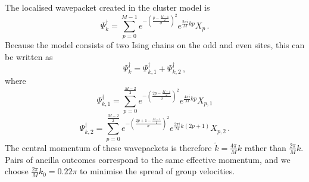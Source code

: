 \documentclass[aps,floatfix,10pt,amssymb,amsfont,amsmath,superscriptaddress,float,nofootinbib,longbibliography,nobalancelastpage,twocolumn]{revtex4-2}
\begin{document}
The localised wavepacket created in the cluster model is
\begin{equation}
    \Psi_k^{\dagger} = \sum_{p=0}^{M-1} e^{-\left(\frac{p-\frac{M-1}{2}}{\sigma}\right)^2}e^{\frac{2\pi i}{M}k p} X_p \,.
\end{equation}
Because the model consists of two Ising chains on the odd and even sites, this can be written as
\begin{equation}
    \Psi_k^{\dagger} = \Psi_{k,1}^{\dagger} +\Psi_{k,2}^{\dagger}\,,
\end{equation}
where
\begin{equation}
        \Psi_{k,1}^{\dagger} = \sum_{p=0}^{\frac{M-2}{2}} e^{-\left(\frac{2p-\frac{M-1}{2}}{\sigma}\right)^2}e^{\frac{4\pi i}{M}k p} X_{p,1} 
\end{equation}
\begin{equation}
        \Psi_{k,2}^{\dagger} = \sum_{p=0}^{\frac{M-2}{2}} e^{-\left(\frac{2p+1-\frac{M-1}{2}}{\sigma}\right)^2}e^{\frac{2\pi i}{M}k (2p+1)} X_{p,2} \,.
\end{equation}
The central momentum of these wavepackets is therefore $\tilde k =\frac{4\pi}{M}k$ rather than $\frac{2\pi}{M}k$. Pairs of ancilla outcomes correspond to the same effective momentum, and we choose $\frac{2\pi }{M}k_0=0.22\pi$ to minimise the spread of group velocities.
\end{document}
